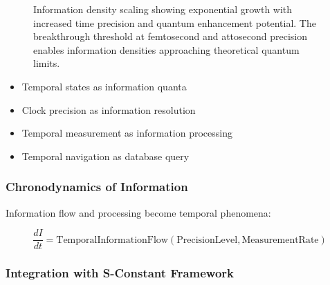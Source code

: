 \documentclass[12pt,a4paper]{article}
\begin{document}
{\begin{figure}[H]
\caption{Information density scaling showing exponential growth with increased time precision and quantum enhancement potential. The breakthrough threshold at femtosecond and attosecond precision enables information densities approaching theoretical quantum limits.}
\label{fig:information_density_scaling}
\end{figure}

\begin{itemize}
\item Temporal states as information quanta
\item Clock precision as information resolution
\item Temporal measurement as information processing
\item Temporal navigation as database query
\end{itemize}

\subsubsection{Chronodynamics of Information}

Information flow and processing become temporal phenomena:

\begin{equation}
\frac{dI}{dt} = \text{TemporalInformationFlow}(\text{PrecisionLevel}, \text{MeasurementRate})
\end{equation}

\subsubsection{Integration with S-Constant Framework}

}
\end{document}

